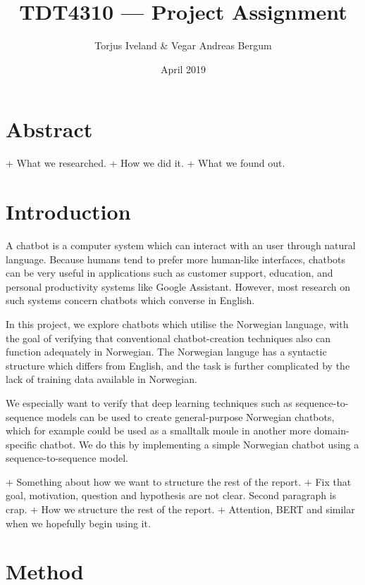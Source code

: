 \documentclass{article}
\title{TDT4310 --- Project Assignment}
\author{Torjus Iveland \& Vegar Andreas Bergum}
\date{April 2019}
\begin{document}
\maketitle

\section{Abstract}

+ What we researched.
+ How we did it.
+ What we found out.

\section{Introduction}

A chatbot is a computer system which can interact with an user through natural language. Because
humans tend to prefer more human-like interfaces, chatbots can be very useful in applications
such as customer support, education, and personal productivity systems like Google Assistant.
However, most research on such systems concern chatbots which converse in English.

In this project, we explore chatbots which utilise the Norwegian language, with the goal of
verifying that conventional chatbot-creation techniques also can function adequately in
Norwegian. The Norwegian languge has a syntactic structure which differs from English, and
the task is further complicated by the lack of training data available in Norwegian.

We especially want to verify that deep learning techniques such as sequence-to-sequence
models can be used to create general-purpose Norwegian chatbots, which for example could be used
as a smalltalk moule in another more domain-specific chatbot. We do this by implementing a simple
Norwegian chatbot using a sequence-to-sequence model.

+ Something about how we want to structure the rest of the report.
+ Fix that goal, motivation, question and hypothesis are not clear. Second paragraph is crap.
+ How we structure the rest of the report.
+ Attention, BERT and similar when we hopefully begin using it.

\section{Method}

\end{document}
